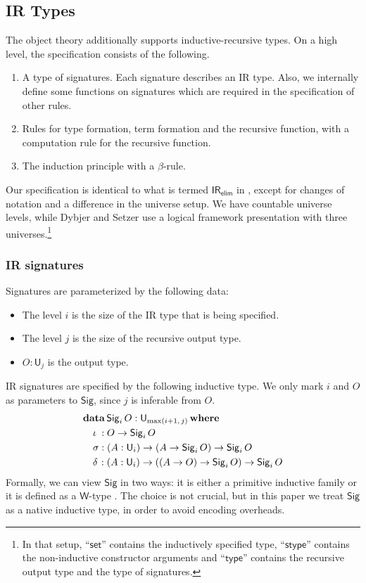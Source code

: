 \documentclass[acmsmall,screen,review,anonymous]{acmart}
\newcommand{\msf}[1]{{\mathsf{#1}}}
\newcommand{\mbf}[1]{{\mathbf{#1}}}
\newcommand{\data}{\mbf{data}}
\newcommand{\U}{\msf{U}}
\newcommand{\where}{\mbf{where}}
\newcommand{\Sig}{\msf{Sig}}
\newcommand{\IR}{\msf{IR}}
\begin{document}
\subsection{IR Types}\label{sec:ir-specification}
The object theory additionally supports inductive-recursive types. On a high level, the
specification consists of the following.
\begin{enumerate}
\item A type of signatures. Each signature describes an IR type. Also, we internally define some
  functions on signatures which are required in the specification of other rules.
\item Rules for type formation, term formation and the recursive function, with a computation rule
  for the recursive function.
\item The induction principle with a $\beta$-rule.
\end{enumerate}

Our specification is identical to what is termed $\mbf{\IR_{\msf{elim}}}$ in
\cite{DBLP:journals/apal/DybjerS03}, except for changes of notation and a difference in the universe
setup. We have countable universe levels, while Dybjer and Setzer use a logical framework
presentation with three universes.\footnote{In that setup, ``$\msf{set}$'' contains the
inductively specified type, ``$\msf{stype}$'' contains the non-inductive constructor arguments and
``$\msf{type}$'' contains the recursive output type and the type of signatures.}

\subsubsection{IR signatures}\label{sec:ir-signatures}
Signatures are parameterized by the following data:
\begin{itemize}
\item The level $i$ is the size of the IR type that is being specified.
\item The level $j$ is the size of the recursive output type.
\item $O : \U_j$ is the output type.
\end{itemize}
IR signatures are specified by the following inductive type. We only mark $i$ and $O$ as parameters to $\Sig$,
since $j$ is inferable from $O$.
\begin{alignat*}{4}
  &\data\, \Sig_i\,O : \U_{\max(i+1,\,j)}\,\where\\
  &\quad \iota\hspace{0.25em}  : O \to \Sig_i\,O \\
  &\quad \sigma               : (A : \U_i) \to (A \to \Sig_i\,O) \to \Sig_i\,O \\
  &\quad \delta\hspace{0.1em} : (A : \U_i) \to ((A \to O) \to \Sig_i\,O) \to \Sig_i\,O
\end{alignat*}
Formally, we can view $\Sig$ in two ways: it is either a primitive inductive family \cite{inductivefamilies} or
it is defined as a $\msf{W}$-type \cite{whynotw}. The choice is not crucial, but in this paper
we treat $\Sig$ as a native inductive type, in order to avoid encoding overheads.
\end{document}
